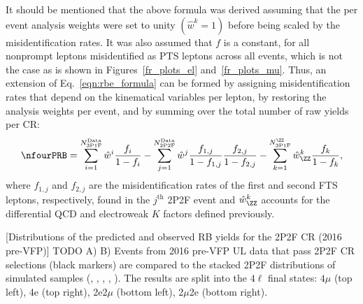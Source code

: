 It should be mentioned that the above formula was derived assuming that the per event analysis weights were set to unity $\left( \hat{w}^k = 1 \right)$ before being scaled by the misidentification rates.
It was also assumed that $f$ is a constant, for all nonprompt leptons misidentified as PTS leptons across all events, which is not the case as is shown in Figures~\ref{fr_plots_el} and~\ref{fr_plots_mu}.
Thus, an extension of Eq.~\ref{eqn:rbe_formula} can be formed by assigning misidentification rates that depend on the kinematical variables per lepton,
by restoring the analysis weights per event,
and by summing over the total number of raw yields per CR:
\begin{equation}
	\label{eqn:rbe_formula_final}
	\nfourPRB =
	  \sum_{i=1}^{N_{\text{3P1F}}^\text{Data}} \hat{w}^i \frac{f_i}{1 - f_i}
	- \sum_{j=1}^{N_{\text{2P2F}}^\text{Data}} \hat{w}^j \frac{f_{1,j}}{1 - f_{1,j}}\frac{f_{2,j}}{1 - f_{2,j}}
	- \sum_{k=1}^{N_{\text{3P1F}}^{\ZZ}} \hat{w}^{k}_{\ZZ} \frac{f_k}{1 - f_k},
\end{equation}
where $f_{1,j}$ and $f_{2,j}$ are the misidentification rates of the first and second FTS leptons, respectively, found in the $j^{\text{th}}$ 2P2F event
and $\hat{w}^k_{\ZZ}$ accounts for the differential QCD and electroweak $K$ factors defined previously. %
\begin{multiFigure}
	\centering
		[Distributions of the predicted and observed RB yields for the 2P2F CR (2016 pre-VFP)]
		{TODO
		\;A)
		\;B) Events from 2016 pre-VFP UL data that pass 2P2F CR selections (black markers) 
		are compared to the stacked 2P2F distributions of simulated samples
		(\Zplusjets, \ttbarplusjets, \WZ, \ZZ, \Zgammastar).
		The results are split into the $4\ell$ final states:
		$4\mu$ (top left), 4e (top right), 2e2$\mu$ (bottom left), 2$\mu$2e (bottom right).}
	\label{cr_plots_2p2f_2016prevfp}
\end{multiFigure}
